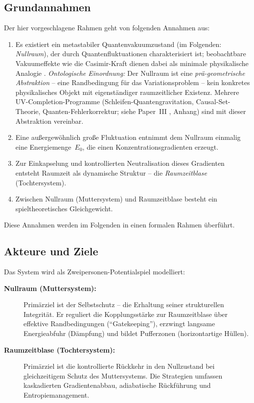 \documentclass[aps,prd,twocolumn,superscriptaddress,nofootinbib]{revtex4-2}
\begin{document}
\subsection{Grundannahmen}
\label{subsec:assumptions}

Der hier vorgeschlagene Rahmen geht von folgenden Annahmen aus:

\begin{enumerate}
\item Es existiert ein metastabiler Quantenvakuumzustand (im Folgenden: \textit{Nullraum}), der durch Quantenfluktuationen charakterisiert ist; beobachtbare Vakuumeffekte wie die Casimir-Kraft dienen dabei als minimale physikalische Analogie \cite{Casimir1948}. \textit{Ontologische Einordnung:} Der Nullraum ist eine \emph{prä-geometrische Abstraktion} -- eine Randbedingung für das Variationsproblem -- kein konkretes physikalisches Objekt mit eigenständiger raumzeitlicher Existenz. Mehrere UV-Completion-Programme (Schleifen-Quantengravitation, Causal-Set-Theorie, Quanten-Fehlerkorrektur; siehe Paper~III \cite{Geiger2026c}, Anhang) sind mit dieser Abstraktion vereinbar.
\item Eine außergewöhnlich große Fluktuation entnimmt dem Nullraum einmalig eine Energiemenge~$E_0$, die einen Konzentrationsgradienten erzeugt.
\item Zur Einkapselung und kontrollierten Neutralisation dieses Gradienten entsteht Raumzeit als dynamische Struktur -- die \textit{Raumzeitblase} (Tochtersystem).
\item Zwischen Nullraum (Muttersystem) und Raumzeitblase besteht ein spieltheoretisches Gleichgewicht.
\end{enumerate}

Diese Annahmen werden im Folgenden in einen formalen Rahmen überführt.

\subsection{Akteure und Ziele}
\label{subsec:agents}

Das System wird als Zweipersonen-Potentialspiel modelliert:

\begin{description}
\item[\textbf{Nullraum (Muttersystem):}] Primärziel ist der Selbstschutz -- die Erhaltung seiner strukturellen Integrität. Er reguliert die Kopplungsstärke zur Raumzeitblase über effektive Randbedingungen (``Gatekeeping''), erzwingt langsame Energieabfuhr (Dämpfung) und bildet Pufferzonen (horizontartige Hüllen).
\item[\textbf{Raumzeitblase (Tochtersystem):}] Primärziel ist die kontrollierte Rückkehr in den Nullzustand bei gleichzeitigem Schutz des Muttersystems. Die Strategien umfassen kaskadierten Gradientenabbau, adiabatische Rückführung und Entropiemanagement.
\end{description}
\end{document}
